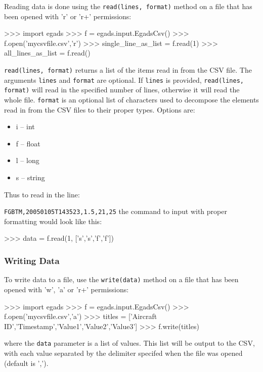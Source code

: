\documentclass[a4paper,11pt]{report}
\begin{document}
Reading data is done using the \verb|read(lines, format)| method on a file that has been opened with 'r' or
'r+' permissions:

\begin{command}
    >>> import egads
    >>> f = egads.input.EgadsCsv()
    >>> f.open('mycsvfile.csv','r')
    >>> single_line_as_list = f.read(1)
    >>> all_lines_as_list = f.read()
\end{command}

\verb|read(lines, format)| returns a list of the items read in from the CSV file. The arguments
\verb|lines| and \verb|format| are optional. If \verb|lines| is provided, \verb|read(lines, format)|
will read in the specified number of lines, otherwise it will read the whole file. \verb|format| 
is an optional list of characters used to decompose the elements read in from the CSV files to
their proper types. Options are:
\begin{itemize}
 \item i -- int
 \item f -- float
 \item l -- long
 \item s -- string
\end{itemize}

Thus to read in the line:

\verb|FGBTM,20050105T143523,1.5,21,25|
%
the command to input with proper formatting would look like this:

\begin{command}
   >>> data = f.read(1, ['s','s','f','f'])
\end{command}

\subsubsection{Writing Data}

To write data to a file, use the \verb|write(data)| method on a file that has been opened with
'w', 'a' or 'r+' permissions:

\begin{command}
   >>> import egads
   >>> f = egads.input.EgadsCsv()
   >>> f.open('mycsvfile.csv','a')
   >>> titles = ['Aircraft ID','Timestamp','Value1','Value2','Value3']
   >>> f.write(titles) 
\end{command}
%
where the \verb|data| parameter is a list of values. This list will be output to the CSV, with each
value separated by the delimiter specifed when the file was opened (default is ',').
\end{document}

